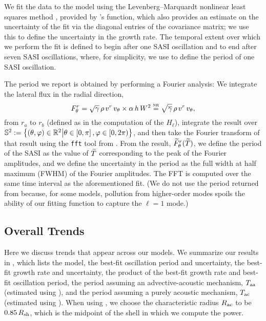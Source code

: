 We fit the data to the model using the Levenberg--Marquardt nonlinear
least squares method \citep[e.g., see][]{m1978},
provided by \scipy 's \curvefit{} function,
which also provides an estimate on the uncertainty of the fit via the diagonal
entries of the covariance matrix; we use this to define the uncertainty
in the growth rate.
The temporal extent over which we perform the fit is defined to begin
after one SASI oscillation and to end after seven SASI oscillations,
where, for simplicity, we use  to define the period of one
SASI oscillation.

The period we report is obtained by performing a Fourier analysis:
We integrate the lateral flux in the radial direction,
\begin{equation}
  F^{r}_{\theta}=\sqrt{\gamma}\,\rho\,v^{r}\,v_{\theta}\times\alpha\,h\,W^{2}
  \stackrel{\textsc{nr}}{=}\sqrt{\overline{\gamma}}\,\rho\,v^{r}\,v_{\theta},
  \label{eq.AP.F12}
\end{equation}
from $r_{a}$ to $r_{b}$ (defined as in the computation of the $H_{\ell}$),
integrate the result over\\
$\mathbb{S}^{2}:=\left\{\left(\theta,\varphi\right)\in\mathbb{R}^{2}
\big|\theta\in\left[0,\pi\right],\varphi\in\left[0,2\pi\right)\right\}$,
and then take the Fourier transform of that result
using the \texttt{fft} tool from \scipy.
From the result, $\widetilde{F}^{r}_{\theta}(\widetilde{T})$,
we define the period of the SASI as the value of $\widetilde{T}$ corresponding to the
peak of the Fourier amplitudes, and
we define the uncertainty in the period as the
full width at half maximum (FWHM) of the Fourier amplitudes.
The FFT is computed over the same time interval as the aforementioned fit.
(We do not use the period returned from \curvefit{} because,
for some models, pollution from
higher-order modes spoils the ability of our fitting function to capture
the $\ell=1$ mode.)

\subsection{Overall Trends}
\label{sec.models}

Here we discuss trends that appear across our models.
We summarize our results in ,
which lists the model, the best-fit oscillation period and uncertainty,
the best-fit growth rate and uncertainty,
the product of the best-fit growth rate and best-fit oscillation period,
the period assuming an advective-acoustic mechanism, $T_{\mathrm{aa}}$
(estimated using ),
and the period assuming a purely acoustic mechanism, $T_{\mathrm{ac}}$
(estimated using ).
When using , we choose the characteristic radius $R_{\mathrm{ac}}$
to be $0.85\,R_{\mathrm{sh}}$, which is the midpoint of the shell in which we compute
the power.


